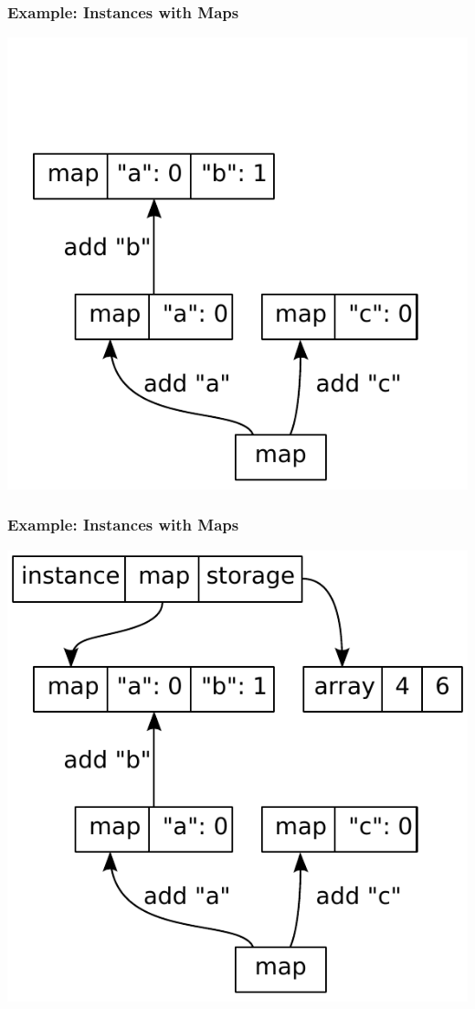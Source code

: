 \documentclass[utf8x]{beamer}
\begin{document}
\begin{frame}
  \frametitle{Example: Instances with Maps}
  \includegraphics[scale=0.5]{figures/map01.pdf}
\end{frame}

\begin{frame}
  \frametitle{Example: Instances with Maps}
  \includegraphics[scale=0.5]{figures/map02.pdf}
\end{frame}
\end{document}
